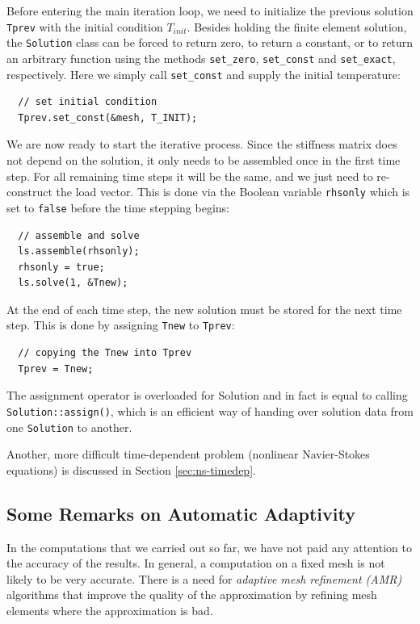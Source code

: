 \documentclass[11pt]{article}
\begin{document}
Before entering the main iteration loop, we need to initialize the previous solution
{\tt Tprev} with the initial condition $T_{init}$. 
Besides holding the finite element solution, the {\tt Solution} class
can be forced to return zero, to return a constant, or to return an arbitrary function
using the methods \verb"set_zero", \verb"set_const" and \verb"set_exact", respectively.
Here we simply call \verb"set_const" and supply the initial temperature:
\begin{lstlisting}
  // set initial condition
  Tprev.set_const(&mesh, T_INIT);
\end{lstlisting}

We are now ready to start the iterative process. Since the stiffness matrix does
not depend on the solution, it only needs to be assembled once in the first time
step. For all remaining time steps it will be the same, and we just need to
re-construct the load vector. This is done via the Boolean variable {\tt rhsonly}
which is set to {\tt false} before the time stepping begins:
\begin{lstlisting}
  // assemble and solve
  ls.assemble(rhsonly);
  rhsonly = true;
  ls.solve(1, &Tnew);
\end{lstlisting}

At the end of each time step, the new solution must be stored for the next time step.
This is done by assigning {\tt Tnew} to {\tt Tprev}:
\begin{lstlisting}
  // copying the Tnew into Tprev
  Tprev = Tnew;
\end{lstlisting}
The assignment operator is overloaded for Solution and in fact is equal to calling
{\tt Solution::assign()}, which is an efficient way of handing over solution data from
one {\tt Solution} to another.

Another, more difficult time-dependent problem (nonlinear Navier-Stokes equations) is discussed
in Section \ref{sec:ns-timedep}.


\subsection{Some Remarks on Automatic Adaptivity}

In the computations that we carried out so far, we have not paid any attention
to the accuracy of the results. In general, a computation on a fixed mesh is
not likely to be very accurate. There is a need for {\it adaptive mesh refinement
(AMR)} algorithms that improve the quality of the approximation by refining
mesh elements where the approximation is bad.
\end{document}
